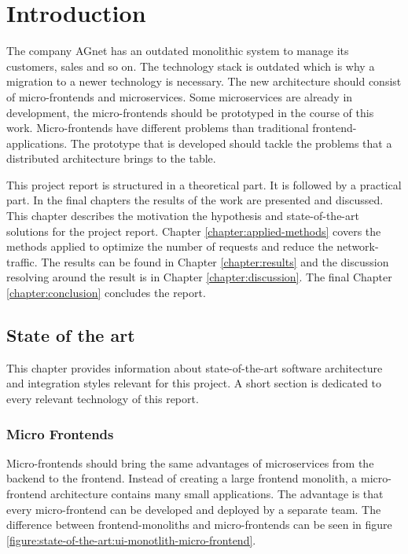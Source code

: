 \chapter{Introduction}\label{chapter:introduction}
 
The company AGnet has an outdated monolithic system to manage its customers, sales and so on. The technology stack is outdated which is why a migration to a newer technology is necessary. The new architecture should consist of micro-frontends and microservices. Some microservices are already in development, the micro-frontends should be prototyped in the course of this work. Micro-frontends have different problems than traditional frontend-applications. The prototype that is developed should tackle the problems that a distributed architecture brings to the table.
 
This project report is structured in a theoretical part. It is followed by a practical part. In the final chapters the results of the work are presented and discussed. This chapter describes the motivation the hypothesis and state-of-the-art solutions for the project report. Chapter \ref{chapter:applied-methods} covers the methods applied to optimize the number of requests and reduce the network-traffic. The results can be found in Chapter \ref{chapter:results} and the discussion resolving around the result is in Chapter \ref{chapter:discussion}. The final Chapter \ref{chapter:conclusion} concludes the report.

\section{State of the art}

This chapter provides information about state-of-the-art software architecture and integration styles relevant for this project. A short section is dedicated to every relevant technology of this report.

\subsection{Micro Frontends}

Micro-frontends should bring the same advantages of microservices from the backend to the frontend. Instead of creating a large frontend monolith, a micro-frontend architecture contains many small applications. The advantage is that every micro-frontend can be developed and deployed by a separate team. \cite{book:2020:geers:micro-frontends-in-action} The difference between frontend-monoliths and micro-frontends can be seen in figure \ref{figure:state-of-the-art:ui-monotlith-micro-frontend}.

